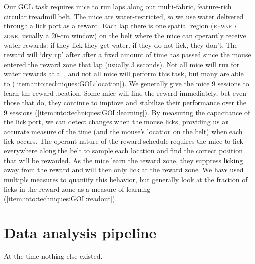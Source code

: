 Our GOL task requires mice to run laps along our multi-fabric, feature-rich circular treadmill belt.
The mice are water-restricted, so we use water delivered through a lick port as a reward.
Each lap there is one spatial region (\textsc{reward zone}, usually a 20-cm window) on the belt where the mice can operantly receive water rewards: if they lick they get water, if they do not lick, they don't.
The reward will `dry up' after after a fixed amount of time has passed since the mouse entered the reward zone that lap (usually 3 seconds).
Not all mice will run for water rewards at all, and not all mice will perform this task, but many are able to (\ref{item:into:techniques:GOL:location}).
We generally give the mice 9 sessions to learn the reward location.
Some mice will find the reward immediately, but even those that do, they continue to imptove and stabilize their performance over the 9 sessions (\ref{item:into:techniques:GOL:learning}).
By measuring the capacitance of the lick port, we can detect changes when the mouse licks, providing us an accurate measure of the time (and the mouse's location on the belt) when each lick occurs.
The operant nature of the reward schedule requires the mice to lick everywhere along the belt to sample each location and find the correct position that will be rewarded.
As the mice learn the reward zone, they suppress licking away from the reward and will then only lick at the reward zone.
We have used multiple measures to quantify this behavior, but generally look at the fraction of licks in the reward zone as a measure of learning (\ref{item:into:techniques:GOL:readout}).

\section{Data analysis pipeline}\label{sec:intro:techniques:pipeline}
At the time nothing else existed.


